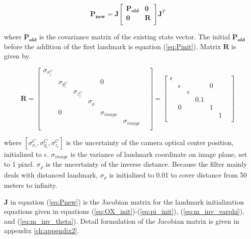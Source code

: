 \begin{equation}
\label{eq:Pnew}
\mathbf{P_{new}}=\mathbf{J}\begin{bmatrix}
\mathbf{P_{old}} & \mathbf{0} \\
\mathbf{0} & \mathbf{R} \\
\end{bmatrix}
\mathbf{J}^{T}
\end{equation}

\noindent where $\mathbf{P_{old}}$ is the covariance matrix of the existing
state vector. The initial $\mathbf{P_{old}}$ before the addition of the first landmark is equation (\ref{eq:Pinit}). Matrix $\mathbf{R}$ is given by.

\begin{equation}
\label{eq:R}
\mathbf{R}=\begin{bmatrix}
\sigma _{x_{i}^{C}} & & & & & & \\
 & \sigma _{y_{i}^{C}} & & & 0 & & \\
 & & \sigma _{z_{i}^{C}} & & & & \\
 & & & \sigma _{\rho } & & & \\
 & 0 & & & \sigma _{image} & & \\
 & & & & & \sigma _{image} & \\
\end{bmatrix}
 = \begin{bmatrix}
\epsilon & & & & & & \\
 & \epsilon & & & 0 & & \\
 & & \epsilon & & & & \\
 & & & 0.1 & & & \\
 & 0 & & & 1 & & \\
 & & & & & 1 & \\
\end{bmatrix} 
\end{equation}

\noindent where $[\sigma_{x_{i}}^{C}, \sigma_{y_{i}}^{C}, \sigma
_{z_{i}}^{C}]$ is the uncertainty of the camera optical center
position, initialized to $\epsilon$. $\sigma_{image}$ is the
variance of landmark coordinate on image plane, set to 1 pixel. $\sigma
_{\rho }$ is the uncertainty of the inverse distance. Because the
filter mainly deals with distanced landmark, $ \sigma _{\rho }$ is
initialized to 0.01 to cover distance from 50 meters to infinity.

$\mathbf{J}$ in equation (\ref{eq:Pnew}) is the Jacobian matrix for
the landmark initialization equations given in equations
(\ref{eq:OX_init})-(\ref{eq:pi_init}),
(\ref{eq:m_inv_varphi}), and (\ref{eq:m_inv_theta}). Detail
formulation of the Jacobian matrix is given in appendix
\ref{ch:appendix2}.



